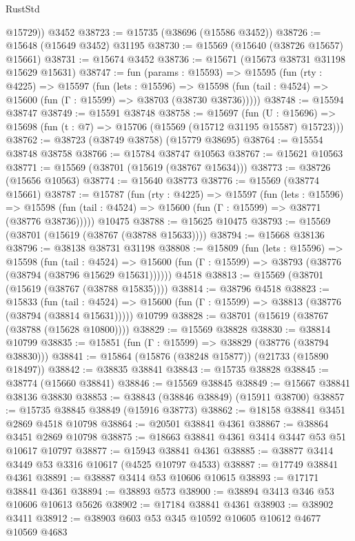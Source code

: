 \begin{lexlean}{RustStd}
\begin{coremodule}
        @15729))
    @3452
@38723 := @15735 (@38696 (@15586 @3452))
@38726 := @15648 (@15649 @3452) @31195
@38730 := @15569 (@15640 (@38726 @15657) @15661)
@38731 := @15674 @3452
@38736 := @15671 (@15673 @38731 @31198 @15629 @15631)
@38747 := fun (params : @15593) =>
  @15595
    (fun (rty : @4225) =>
    @15597
      (fun (lets : @15596) =>
      @15598 (fun (tail : @4524) => @15600 (fun (Γ : @15599) => @38703 (@38730 @38736)))))
@38748 := @15594 @38747
@38749 := @15591 @38748
@38758 := @15697
    (fun (U : @15696) => @15698 (fun (t : @7) => @15706 (@15569 (@15712 @31195 @15587) @15723)))
@38762 := @38723 (@38749 @38758) (@15779 @38695)
@38764 := @15554 @38748 @38758
@38766 := @15784 @38747 @10563
@38767 := @15621 @10563
@38771 := @15569 (@38701 (@15619 (@38767 @15634)))
@38773 := @38726 (@15656 @10563)
@38774 := @15640 @38773
@38776 := @15569 (@38774 @15661)
@38787 := @15787
    (fun (rty : @4225) =>
    @15597
      (fun (lets : @15596) =>
      @15598 (fun (tail : @4524) => @15600 (fun (Γ : @15599) => @38771 (@38776 @38736)))))
    @10475
@38788 := @15625 @10475
@38793 := @15569 (@38701 (@15619 (@38767 (@38788 @15633))))
@38794 := @15668 @38136
@38796 := @38138 @38731 @31198
@38808 := @15809
    (fun (lets : @15596) =>
    @15598
      (fun (tail : @4524) =>
      @15600 (fun (Γ : @15599) => @38793 (@38776 (@38794 (@38796 @15629 @15631))))))
    @4518
@38813 := @15569 (@38701 (@15619 (@38767 (@38788 @15835))))
@38814 := @38796 @4518
@38823 := @15833
    (fun (tail : @4524) => @15600 (fun (Γ : @15599) => @38813 (@38776 (@38794 (@38814 @15631)))))
    @10799
@38828 := @38701 (@15619 (@38767 (@38788 (@15628 @10800))))
@38829 := @15569 @38828
@38830 := @38814 @10799
@38835 := @15851 (fun (Γ : @15599) => @38829 (@38776 (@38794 @38830)))
@38841 := @15864 (@15876 (@38248 @15877)) (@21733 (@15890 @18497))
@38842 := @38835 @38841
@38843 := @15735 @38828
@38845 := @38774 (@15660 @38841)
@38846 := @15569 @38845
@38849 := @15667 @38841 @38136 @38830
@38853 := @38843 (@38846 @38849) (@15911 @38700)
@38857 := @15735 @38845 @38849 (@15916 @38773)
@38862 := @18158 @38841 @3451 @2869 @4518 @10798
@38864 := @20501 @38841 @4361
@38867 := @38864 @3451 @2869 @10798
@38875 := @18663 @38841 @4361 @3414 @3447 @53 @51 @10617 @10797
@38877 := @15943 @38841 @4361
@38885 := @38877 @3414 @3449 @53 @3316 @10617 (@4525 @10797 @4533)
@38887 := @17749 @38841 @4361
@38891 := @38887 @3414 @53 @10606 @10615
@38893 := @17171 @38841 @4361
@38894 := @38893 @573
@38900 := @38894 @3413 @346 @53 @10606 @10613 @5626
@38902 := @17184 @38841 @4361
@38903 := @38902 @3411
@38912 := @38903 @603 @53 @345 @10592 @10605 @10612 @4677 @10569 @4683

\end{coremodule}
\end{lexlean}
